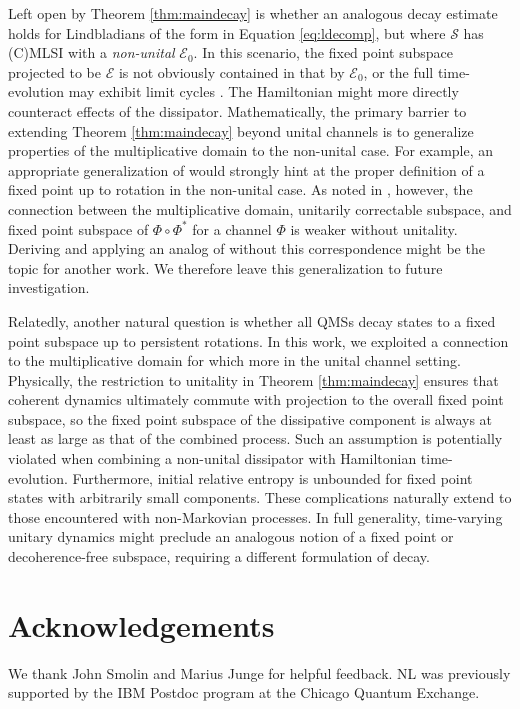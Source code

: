 \documentclass[accepted=2026-02-01, letterpaper]{quantumarticle}
\newcommand{\E}{\mathcal{E}}
\renewcommand{\S}{\mathcal{S}}
\begin{document}
Left open by Theorem \ref{thm:maindecay} is whether an analogous decay estimate holds for Lindbladians of the form in Equation \eqref{eq:ldecomp}, but where $\S$ has (C)MLSI with a \textit{non-unital} $\E_0$. In this scenario, the fixed point subspace projected to be $\E$ is not obviously contained in that by $\E_0$, or the full time-evolution may exhibit limit cycles \cite{walter_quantum_2014, ben_arosh_quantum_2021}. The Hamiltonian might more directly counteract effects of the dissipator. Mathematically, the primary barrier to extending Theorem \ref{thm:maindecay} beyond unital channels is to generalize properties of the multiplicative domain to the non-unital case. For example, an appropriate generalization of \cite[Theorem 1.3]{rahaman_multiplicative_2017} would strongly hint at the proper definition of a fixed point up to rotation in the non-unital case. As noted in \cite{choi_multiplicative_2009}, however, the connection between the multiplicative domain, unitarily correctable subspace, and fixed point subspace of $\Phi \circ \Phi^*$ for a channel $\Phi$ is weaker without unitality. Deriving and applying an analog of \cite[Theorem 1.3]{rahaman_multiplicative_2017} without this correspondence might be the topic for another work. We therefore leave this generalization to future investigation.

Relatedly, another natural question is whether all QMSs decay states to a fixed point subspace up to persistent rotations. In this work, we exploited a connection to the multiplicative domain for which more in the unital channel setting. Physically, the restriction to unitality in Theorem \ref{thm:maindecay} ensures that coherent dynamics ultimately commute with projection to the overall fixed point subspace, so the fixed point subspace of the dissipative component is always at least as large as that of the combined process. Such an assumption is potentially violated when combining a non-unital dissipator with Hamiltonian time-evolution. Furthermore, initial relative entropy is unbounded for fixed point states with arbitrarily small components. These complications naturally extend to those encountered with non-Markovian processes. In full generality, time-varying unitary dynamics might preclude an analogous notion of a fixed point or decoherence-free subspace, requiring a different formulation of decay.




\section{Acknowledgements}
We thank John Smolin and Marius Junge for helpful feedback. NL was previously supported by the IBM Postdoc program at the Chicago Quantum Exchange. 
\end{document}
